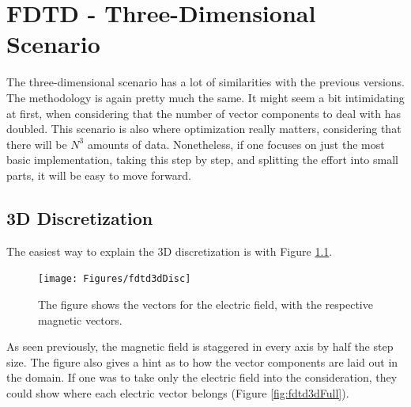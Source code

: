 
\chapter{FDTD - Three-Dimensional Scenario} %

\label{Chapter4} %


The three-dimensional scenario has a lot of similarities with the previous versions. The methodology is again pretty much the same. It might seem a bit intimidating at first, when considering that the number of vector components to deal with has doubled. This scenario is also where optimization really matters, considering that there will be $N^3$ amounts of data. Nonetheless, if one focuses on just the most basic implementation, taking this step by step, and splitting the effort into small parts, it will be easy to move forward.

\clearpage

\section{3D Discretization}

The easiest way to explain the 3D discretization is with Figure \ref{fig:fdtd3dDisc}.

\begin{figure}[h!]
	\centering
	\texttt{[image: Figures/fdtd3dDisc]}
	\decoRule
	\caption[3D Electric Discretization]{The figure shows the vectors for the electric field, with the respective magnetic vectors.}
	\label{fig:fdtd3dDisc}
\end{figure}

As seen previously, the magnetic field is staggered in every axis by half the step size. The figure also gives a hint as to how the vector components are laid out in the domain. If one was to take only the electric field into the consideration, they could show where each electric vector belongs (Figure \ref{fig:fdtd3dFull}). 


